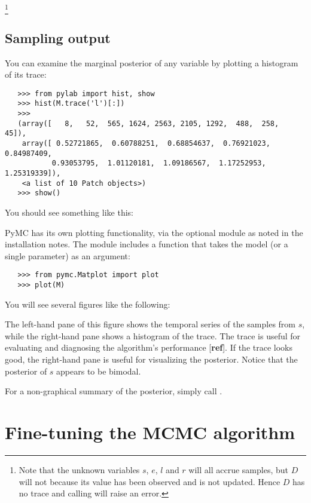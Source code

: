 \footnote{Note that the unknown variables $s$, $e$, $l$ and $r$ will all
accrue samples, but $D$ will not because its value has been observed and is
not updated. Hence $D$ has no trace and calling  will
raise an error. }

\subsection*{Sampling output} 
You can examine the marginal posterior of any variable by plotting a histogram of its trace:
\begin{verbatim}
   >>> from pylab import hist, show
   >>> hist(M.trace('l')[:])
   >>> 
   (array([   8,   52,  565, 1624, 2563, 2105, 1292,  488,  258,   45]),
    array([ 0.52721865,  0.60788251,  0.68854637,  0.76921023,  0.84987409,
           0.93053795,  1.01120181,  1.09186567,  1.17252953,  1.25319339]),
    <a list of 10 Patch objects>)
   >>> show()
\end{verbatim}
You should see something like this:
\begin{center}
\end{center}
PyMC has its own plotting functionality, via the optional
 module as noted in the installation notes. The
 module includes a  function that takes the
model (or a single parameter) as an argument:
\begin{verbatim}
   >>> from pymc.Matplot import plot
   >>> plot(M)
\end{verbatim}
You will see several figures like the following:
\begin{center}
\end{center}
The left-hand pane of this figure shows the temporal series of the samples from $s$, while the right-hand pane shows a histogram of the trace. The trace is useful for evaluating and diagnosing the algorithm's performance [\textbf{ref}]. If the trace looks good, the right-hand pane is useful for visualizing the posterior. Notice that the posterior of $s$ appears to be bimodal.

For a non-graphical summary of the posterior, simply call .


\section*{Fine-tuning the MCMC algorithm} 

